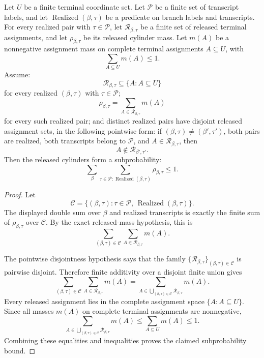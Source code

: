 \begin{helper}
Let \(U\) be a finite terminal coordinate set.  Let \(\mathcal P\) be a
finite set of transcript labels, and let
\(\operatorname{Realized}(\beta,\tau)\) be a predicate on branch labels and
transcripts.  For every realized pair with \(\tau\in\mathcal P\), let
\(\mathcal R_{\beta,\tau}\) be a finite set of released terminal
assignments, and let \(\rho_{\beta,\tau}\) be its released cylinder mass.
Let \(m(A)\) be a nonnegative assignment mass on complete terminal
assignments \(A\subseteq U\), with
\[
\sum_{A\subseteq U}m(A)\le 1 .
\]
Assume:
\[
\mathcal R_{\beta,\tau}\subseteq \{A:A\subseteq U\}
\]
for every realized \((\beta,\tau)\) with \(\tau\in\mathcal P\);
\[
\rho_{\beta,\tau}=\sum_{A\in\mathcal R_{\beta,\tau}}m(A)
\]
for every such realized pair; and distinct realized pairs have disjoint
released assignment sets, in the following pointwise form: if
\((\beta,\tau)\ne(\beta',\tau')\), both pairs are realized, both transcripts
belong to \(\mathcal P\), and \(A\in\mathcal R_{\beta,\tau}\), then
\[
A\notin\mathcal R_{\beta',\tau'} .
\]
Then the released cylinders form a subprobability:
\[
\sum_{\beta}
  \sum_{\tau\in\mathcal P:\operatorname{Realized}(\beta,\tau)}
    \rho_{\beta,\tau}
\le 1 .
\]
\end{helper}
\begin{proof}
Let
\[
\mathcal C
  =\{(\beta,\tau):\tau\in\mathcal P,\,
      \operatorname{Realized}(\beta,\tau)\}.
\]
The displayed double sum over \(\beta\) and realized transcripts is exactly
the finite sum of \(\rho_{\beta,\tau}\) over \(\mathcal C\).  By the exact
released-mass hypothesis, this is
\[
\sum_{(\beta,\tau)\in\mathcal C}
  \sum_{A\in\mathcal R_{\beta,\tau}}m(A).
\]

The pointwise disjointness hypothesis says that the family
\(\{\mathcal R_{\beta,\tau}\}_{(\beta,\tau)\in\mathcal C}\) is pairwise
disjoint.  Therefore finite additivity over a disjoint finite union gives
\[
\sum_{(\beta,\tau)\in\mathcal C}
  \sum_{A\in\mathcal R_{\beta,\tau}}m(A)
=
\sum_{A\in\bigcup_{(\beta,\tau)\in\mathcal C}
  \mathcal R_{\beta,\tau}}m(A).
\]
Every released assignment lies in the complete assignment space
\(\{A:A\subseteq U\}\).  Since all masses \(m(A)\) on complete terminal
assignments are nonnegative,
\[
\sum_{A\in\bigcup_{(\beta,\tau)\in\mathcal C}
  \mathcal R_{\beta,\tau}}m(A)
\le
\sum_{A\subseteq U}m(A)
\le 1 .
\]
Combining these equalities and inequalities proves the claimed
subprobability bound.
\end{proof}
